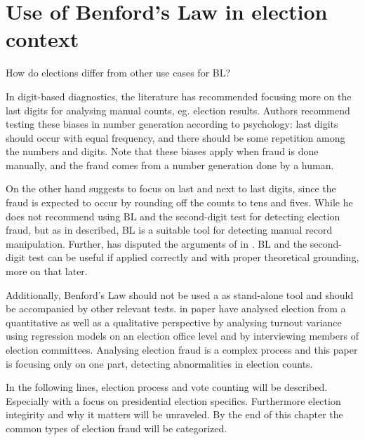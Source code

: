 \section{Use of Benford's Law in election context}

\begin{koment}
    How do elections differ from other use cases for BL? 
\end{koment}


In digit-based diagnostics, the literature has recommended focusing more on the last digits for analysing manual counts, eg. election results. %
Authors \citeauthor{Beber2012} recommend testing these biases in number generation according to psychology: last digits should occur with equal frequency, and there should be some repetition among the numbers and digits. Note that these biases apply when fraud is done manually, and the fraud comes from a number generation done by a human. 

On the other hand \citeauthor{Deckert2011} suggests to focus on last and next to last digits, since the fraud is expected to occur by rounding off the counts to tens and fives. While he does not recommend using BL and the second-digit test for detecting election fraud, but as \citeauthor{Beber2012} in \citeyear{Beber2012} described, BL is a suitable tool for detecting manual record manipulation. Further, \citeauthor{Mebane2011} has disputed the arguments of \citeauthor{Deckert2011} in \citeyear{Mebane2011}. BL and the second-digit test can be useful if applied correctly and with proper theoretical grounding, more on that later.

Additionally, Benford's Law should not be used a as stand-alone tool and should be accompanied by other relevant tests. \citeauthor{Lebeda2021} in paper  have analysed election from a quantitative as well as a qualitative perspective by analysing turnout variance using regression models on an election office level and by interviewing members of election committees. Analysing election fraud is a complex process and this paper is focusing only on one part, detecting abnormalities in election counts. 


In the following lines, election process and vote counting will be described. Especially with a focus on presidential election specifics. Furthermore election integirity and why it matters will be unraveled. By the end of this chapter the common types of election fraud will be categorized.  



